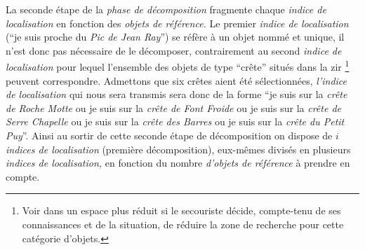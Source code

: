 La seconde étape de la \emph{phase de décomposition} fragmente chaque
\emph{indice de localisation} en fonction des \emph{objets de
  référence.} Le premier \emph{indice de localisation} (\enquote{je
  suis proche du \emph{Pic de Jean Ray}}) se réfère à un objet nommé
et unique, il n'est donc pas nécessaire de le décomposer,
contrairement au second \emph{indice de localisation} pour lequel
l'ensemble des objets de type \enquote{crête} situés dans la \ac{zir}
\footnote{Voir dans un espace plus réduit si le secouriste décide,
  compte-tenu de ses connaissances et de la situation, de réduire la
  zone de recherche pour cette catégorie d'objets.} peuvent
correspondre. Admettons que six crêtes aient été sélectionnées,
\emph{l'indice de localisation} qui nous sera transmis sera donc de la
forme \enquote{je suis sur la \emph{crête de Roche Motte} ou je suis
  sur la \emph{crête de Font Froide} ou je suis sur la \emph{crête de
    Serre Chapelle} ou je suis sur la \emph{crête des Barres} ou je
  suis sur la \emph{crête du Petit Puy}}. Ainsi au sortir de cette
seconde étape de décomposition on dispose de \(i\) \emph{indices de
  localisation} (première décomposition), eux-mêmes divisés en
plusieurs \emph{indices de localisation,} en fonction du nombre
\emph{d'objets de référence} à prendre en compte.

\begin{quote}
\end{quote}


